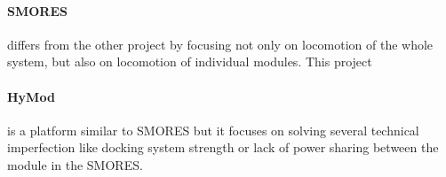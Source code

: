 \paragraph{SMORES} \cite{davey_emulating_2012} differs from the other project by
focusing not only on locomotion of the whole system, but also on locomotion of
individual modules. This project

\paragraph{HyMod} \cite{gros_hymod:_2018} is a platform similar to SMORES but it
focuses on solving several technical imperfection like docking system strength
or lack of power sharing between the module in the SMORES.

